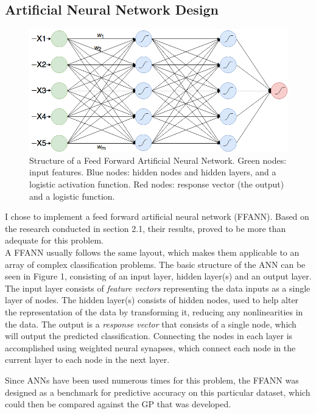 \documentclass[11pt]{article}
\begin{document}
\subsection{Artificial Neural Network Design}
\begin{figure}[h]
\centering
\captionsetup{justification=centering}
\includegraphics[scale = .37]{ANN}%
\caption{Structure of a Feed Forward Artificial Neural Network. Green nodes: input features. Blue nodes: hidden nodes and hidden layers, and a logistic activation function. Red nodes: response vector (the output) and a logistic function.} 
\end{figure}
I chose to implement a feed forward artificial neural network (FFANN). Based on the research conducted in section 2.1, their results, proved to be more than adequate for this problem.\\
A FFANN usually follows the same layout, which makes them applicable to an array of complex classification problems. The basic structure of the ANN can be seen in Figure 1, consisting of an input layer, hidden layer(s) and an output layer. The input layer consists of \textit{feature vectors} representing the data inputs as a single layer of nodes. The hidden layer(s) consists of hidden nodes, used to help alter the representation of the data by transforming it, reducing any nonlinearities in the data. The output is a \textit{response vector} that consists of a single node, which will output the predicted classification. Connecting the nodes in each layer is accomplished using weighted neural synapses, which connect each node in the current layer to each node in the next layer. 

Since ANNs have been used numerous times for this problem, the FFANN was designed as a benchmark for predictive accuracy on this particular dataset, which could then be compared against the GP that was developed. 
\end{document}
